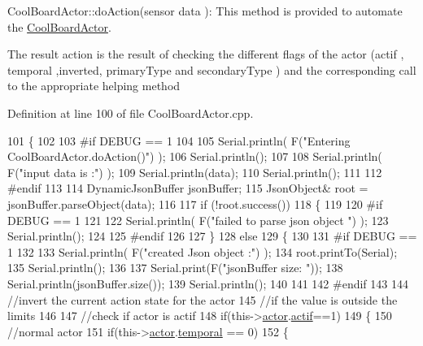 Cool\+Board\+Actor\+::do\+Action(sensor data )\+: This method is provided to automate the \hyperlink{class_cool_board_actor}{Cool\+Board\+Actor}.

The result action is the result of checking the different flags of the actor (actif , temporal ,inverted, primary\+Type and secondary\+Type ) and the corresponding call to the appropriate helping method 

Definition at line 100 of file Cool\+Board\+Actor.\+cpp.


\begin{DoxyCode}
101 \{
102 
103 \textcolor{preprocessor}{#if DEBUG == 1 }
104 
105     Serial.println( F(\textcolor{stringliteral}{"Entering CoolBoardActor.doAction()"}) );
106     Serial.println();
107 
108     Serial.println( F(\textcolor{stringliteral}{"input data is :"}) );
109     Serial.println(data);
110     Serial.println();
111 
112 \textcolor{preprocessor}{#endif }
113 
114     DynamicJsonBuffer jsonBuffer;
115     JsonObject& root = jsonBuffer.parseObject(data);
116     
117     \textcolor{keywordflow}{if} (!root.success()) 
118     \{
119     
120 \textcolor{preprocessor}{    #if DEBUG == 1 }
121 
122         Serial.println( F(\textcolor{stringliteral}{"failed to parse json object "}) );
123         Serial.println();
124     
125 \textcolor{preprocessor}{    #endif }
126 
127     \}
128     \textcolor{keywordflow}{else}
129     \{
130     
131 \textcolor{preprocessor}{    #if DEBUG == 1 }
132 
133         Serial.println( F(\textcolor{stringliteral}{"created Json object :"}) );
134         root.printTo(Serial);
135         Serial.println();
136 
137         Serial.print(F(\textcolor{stringliteral}{"jsonBuffer size: "}));
138         Serial.println(jsonBuffer.size());
139         Serial.println();
140 
141     
142 \textcolor{preprocessor}{    #endif }
143 
144         \textcolor{comment}{//invert the current action state for the actor}
145         \textcolor{comment}{//if the value is outside the limits}
146         
147         \textcolor{comment}{//check if actor is actif}
148         \textcolor{keywordflow}{if}(this->\hyperlink{class_cool_board_actor_a8f190db9f7a39fddbcef7f152da970e9}{actor}.\hyperlink{struct_cool_board_actor_1_1state_a7963178c2de01ef0d2861f9f59ad6f3c}{actif}==1)
149         \{
150             \textcolor{comment}{//normal actor}
151             \textcolor{keywordflow}{if}(this->\hyperlink{class_cool_board_actor_a8f190db9f7a39fddbcef7f152da970e9}{actor}.\hyperlink{struct_cool_board_actor_1_1state_a6442a8c3a30abc48472f3e5284b786ea}{temporal} == 0)
152             \{

\end{DoxyCode}
